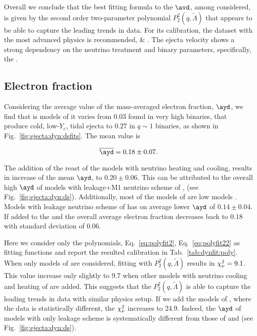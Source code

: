 Overall we conclude that the best fitting formula to the $\avd$, among considered, is given by the 
second order two-parameter polynomial $P_2^2(q,\tilde\Lambda)$ that appears to be able to capture 
the leading trends in data. For its calibration, the dataset with the most advanced physics is 
recommended, \DSheatcool{} \& \DSrefset{}.
The ejecta velocity shows a strong dependency on the neutrino treatment and binary parameters, 
specifically, the \mr{}.


\subsection{Electron fraction} 

Considering the average value of the mass-averaged electron fraction, $\ayd$, we find that is models 
of \DSrefset{} it varies from $0.03$ found in very high \mr{} binaries,
that produce cold, low-$Y_e$, tidal ejecta \cite{Bernuzzi:2020tgt} to $0.27$ in $q\sim1$ binaries, 
as shown in Fig.~\ref{fig:ejecta:dyn:dsfits}.
The mean value is 

\begin{equation}
\label{eq:ejecta:dyn:avg:y}
\overline{\ayd} = 0.18 \pm 0.07.
\end{equation}

The addition of the reast of the models with neutrino heating and cooling, \DSheatcool{} results in 
increase of the mean $\ayd$, to $0.20 \pm 0.06$.
This can be attributed to the overall high $\ayd$ of models with leakage+M1 neutrino scheme of 
\citet{Sekiguchi:2015dma,Sekiguchi:2016bjd}, (see Fig.~\ref{fig:ejecta:dyn:ds}).
Additionally, most of the models of \DSheatcool{} are low \mr{} models \citep[\eg][]{Vincent:2019kor}.
Models with leakage neutrino scheme of \DScool{} has on average lower $\ayd$ of $0.14 \pm 0.04$.
If added to the \DSheatcool{} and \DSrefset{} the overall average electron fraction decreases back 
to $0.18$ with standard deviation of $0.06$.

Here we consider only the polynomials, Eq.~\ref{eq:polyfit2}, Eq.~\ref{eq:polyfit22} as fitting functions
and report the resulted calibration in Tab.~\ref{tab:dynfit:poly}.
When only models of \DSrefset{} are considered, fitting with $P_2^2(q,\tilde{\Lambda})$ results 
in $\chi_{\nu}^2=9.1$. This value increase only slightly to $9.7$ when other models with neutrino 
cooling and heating of \DSheatcool{} are added. This suggests that the $P_2^2(q,\tilde{\Lambda})$ 
is able to capture the leading trends in data with similar physics setup.
If we add the models of \DScool{}, where the data is statistically different, the $\chi_{\nu}^2$ increases 
to $24.9$. Indeed, the $\ayd$ of models with only leakage scheme is systematically different from those 
of \DSheatcool{} and \DSrefset{} (see Fig.~\ref{fig:ejecta:dyn:ds}).

